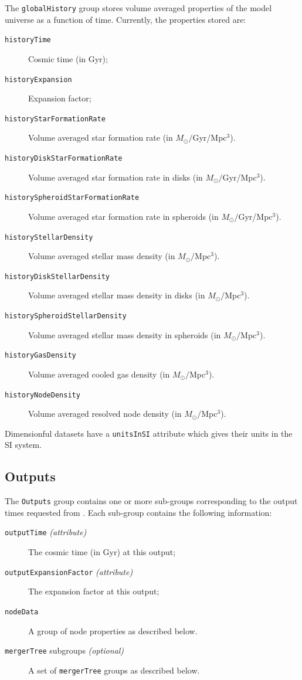 The {\tt globalHistory} group stores volume averaged properties of the model universe as a function of time. Currently, the properties stored are:
\begin{description}
 \item[{\tt historyTime}] Cosmic time (in Gyr);
 \item[{\tt historyExpansion}] Expansion factor;
 \item[{\tt historyStarFormationRate}] Volume averaged star formation rate (in $M_\odot/$Gyr/Mpc$^3$).
 \item[{\tt historyDiskStarFormationRate}] Volume averaged star formation rate in disks (in $M_\odot/$Gyr/Mpc$^3$).
 \item[{\tt historySpheroidStarFormationRate}] Volume averaged star formation rate in spheroids (in $M_\odot/$Gyr/Mpc$^3$).
 \item[{\tt historyStellarDensity}] Volume averaged stellar mass density (in $M_\odot/$Mpc$^3$).
 \item[{\tt historyDiskStellarDensity}] Volume averaged stellar mass density in disks (in $M_\odot/$Mpc$^3$).
 \item[{\tt historySpheroidStellarDensity}] Volume averaged stellar mass density in spheroids (in $M_\odot/$Mpc$^3$).
 \item[{\tt historyGasDensity}] Volume averaged cooled gas density (in $M_\odot/$Mpc$^3$).
 \item[{\tt historyNodeDensity}] Volume averaged resolved node density (in $M_\odot/$Mpc$^3$).
\end{description}
Dimensionful datasets have a {\tt unitsInSI} attribute which gives their units in the SI system.

\subsection{Outputs}

The {\tt Outputs} group contains one or more sub-groups corresponding to the output times requested from \glc. Each sub-group contains the following information:
\begin{description}
 \item[{\tt outputTime} \emph{(attribute)}] The cosmic time (in Gyr) at this output;
 \item[{\tt outputExpansionFactor} \emph{(attribute)}] The expansion factor at this output;
 \item[{\tt nodeData}] A group of node properties as described below.
 \item[{\tt mergerTree} subgroups \emph{(optional)}] A set of {\tt mergerTree} groups as described below.
\end{description}

